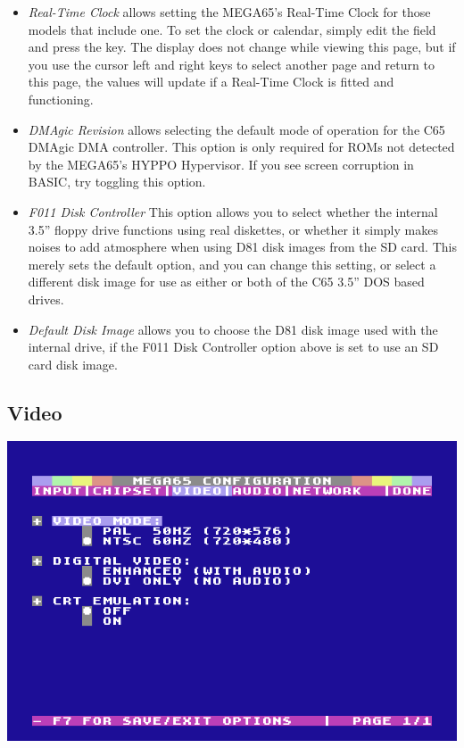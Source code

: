 \begin{itemize}
  \item{\em Real-Time Clock} allows setting the MEGA65's Real-Time
    Clock for those models that include one.  To set the clock or
    calendar, simply edit the field and press the 
    key.  The display does not change while viewing this page, but if
    you use the cursor left and right keys to select another page and
    return to this page, the values will update if a Real-Time Clock
    is fitted and functioning.
  \item{\em DMAgic Revision} allows selecting the default mode of
    operation for the C65 DMAgic DMA controller.  This option is only
    required for ROMs not detected by the MEGA65's HYPPO Hypervisor.
    If you see screen corruption in BASIC,
    try toggling this option.
  \item{\em F011 Disk Controller}
    This option allows you to select whether the internal 3.5'' floppy
    drive functions using real diskettes, or whether it simply makes
    noises to add atmosphere when using D81 disk images from the SD
    card.  This merely sets the default option, and you can change
    this setting, or select a different disk image for use as either
    or both of the C65 3.5'' DOS based drives.
  \item{\em Default Disk Image} allows you to choose the D81 disk image
    used with the internal drive, if the F011 Disk
    Controller option above is set to use an SD card disk image.    
\end{itemize}

\subsection{Video}

\includegraphics[width=\linewidth]{images/ss-m65config-3.png}

